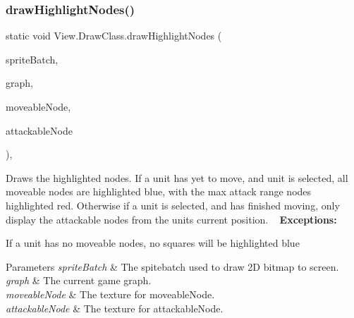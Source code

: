 \subsubsection{\texorpdfstring{draw\+Highlight\+Nodes()}{drawHighlightNodes()}}
{\footnotesize\ttfamily static void View.\+Draw\+Class.\+draw\+Highlight\+Nodes (\begin{DoxyParamCaption}\item[{Sprite\+Batch}]{sprite\+Batch,  }\item[{\hyperlink{class_model_1_1_map_module_1_1_graph}{Graph}}]{graph,  }\item[{Texture2D}]{moveable\+Node,  }\item[{Texture2D}]{attackable\+Node }\end{DoxyParamCaption})\hspace{0.3cm}{\ttfamily [inline]}, {\ttfamily [static]}}

Draws the highlighted nodes. If a unit has yet to move, and unit is selected, all moveable nodes are highlighted blue, with the max attack range nodes highlighted red. Otherwise if a unit is selected, and has finished moving, only display the attackable nodes from the unit\textquotesingle{}s current position. ~\newline
 {\bfseries Exceptions\+:} ~\newline

\begin{DoxyItemize}
\item If a unit has no moveable nodes, no squares will be highlighted blue 
\begin{DoxyParams}{Parameters}
{\em sprite\+Batch} & The spitebatch used to draw 2D bitmap to screen. \\
\hline
{\em graph} & The current game graph. \\
\hline
{\em moveable\+Node} & The texture for moveable\+Node. \\
\hline
{\em attackable\+Node} & The texture for attackable\+Node. \\
\hline
\end{DoxyParams}

\end{DoxyItemize}\hypertarget{class_view_1_1_draw_class_a02cb24dbfed917cc4f9eb2bc9309664e}{}\label{class_view_1_1_draw_class_a02cb24dbfed917cc4f9eb2bc9309664e} 
